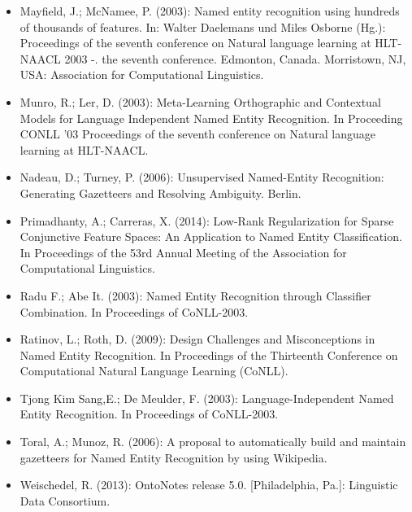 \documentclass{beamer}
\begin{document}
	\begin{frame}
			\begin{itemize}
			\item Mayfield, J.; McNamee, P. (2003): Named entity recognition using hundreds of thousands of features. In: Walter Daelemans und Miles Osborne (Hg.): Proceedings of the seventh conference on Natural language learning at HLT-NAACL 2003 -. the seventh conference. Edmonton, Canada. Morristown, NJ, USA: Association for Computational Linguistics.\\
			\item Munro, R.; Ler, D. (2003): Meta-Learning Orthographic and Contextual Models for Language Independent Named Entity Recognition. In Proceeding
			CONLL '03 Proceedings of the seventh conference on Natural language learning at HLT-NAACL.\\
			\item Nadeau, D.; Turney, P. (2006): Unsupervised Named-Entity Recognition: Generating Gazetteers and Resolving Ambiguity. Berlin.

			
				\item Primadhanty, A.; Carreras, X. (2014): Low-Rank Regularization for Sparse Conjunctive Feature Spaces:
				An Application to Named Entity Classification. In Proceedings of the 53rd Annual Meeting of the Association for Computational Linguistics.

			\end{itemize}
	\end{frame}
	\begin{frame}
			\begin{itemize}
				\item Radu F.; Abe It. (2003):  Named Entity Recognition
				through Classifier Combination. In
				Proceedings of 	CoNLL-2003.\\
				\item Ratinov, L.; Roth, D. (2009): Design Challenges and Misconceptions in Named Entity Recognition. In Proceedings of the Thirteenth Conference on Computational Natural Language Learning (CoNLL).
				\item Tjong Kim Sang,E.; De Meulder, F. (2003): Language-Independent Named Entity Recognition. In
				Proceedings of 	CoNLL-2003.\\
				\item Toral, A.; Munoz, R. (2006): A proposal to automatically build and maintain gazetteers for Named Entity Recognition by using Wikipedia.\\
				\item Weischedel, R. (2013): OntoNotes release 5.0. [Philadelphia, Pa.]: Linguistic Data Consortium.\\
			\end{itemize}
	\end{frame}
\end{document}
